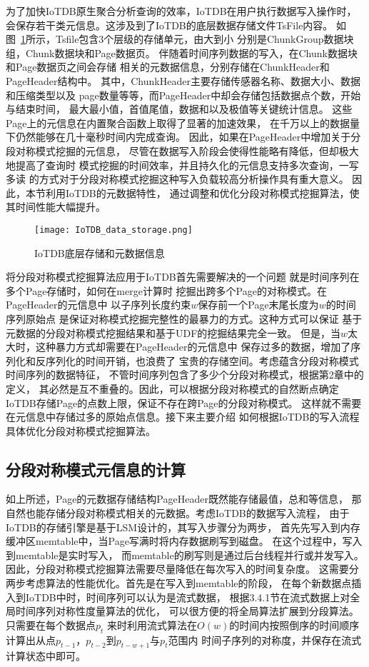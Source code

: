 为了加快IoTDB原生聚合分析查询的效率，IoTDB在用户执行数据写入操作时，
会保存若干类元信息。这涉及到了IoTDB的底层数据存储文件TsFile内容。
如图~\ref{fig:iotdb}所示，Tsfile包含3个层级的存储单元，由大到小
分别是ChunkGroup数据块组，Chunk数据块和Page数据页。
伴随着时间序列数据的写入，在Chunk数据块和Page数据页之间会存储
相关的元数据信息，分别存储在ChunkHeader和PageHeader结构中。
其中，ChunkHeader主要存储传感器名称、数据大小、数据和压缩类型以及
page数量等等，而PageHeader中却会存储包括数据点个数，开始与结束时间，
最大最小值，首值尾值，数据和以及极值等关键统计信息。
这些Page上的元信息在内置聚合函数上取得了显著的加速效果，
在千万以上的数据量下仍然能够在几十毫秒时间内完成查询。
因此，如果在PageHeader中增加关于分段对称模式挖掘的元信息，
尽管在数据写入阶段会使得性能略有降低，但却极大地提高了查询时
模式挖掘的时间效率，并且持久化的元信息支持多次查询，一写多读
的方式对于分段对称模式挖掘这种写入负载较高分析操作具有重大意义。
因此，本节利用IoTDB的元数据特性，
通过调整和优化分段对称模式挖掘算法，使其时间性能大幅提升。
\begin{figure}
  \centering
  \texttt{[image: IoTDB\_data\_storage.png]}
  \caption{IoTDB底层存储和元数据信息}
  \label{fig:iotdb}
\end{figure}

将分段对称模式挖掘算法应用于IoTDB首先需要解决的一个问题
就是时间序列在多个Page存储时，如何在merge计算时
挖掘出跨多个Page的对称模式。在PageHeader的元信息中
以子序列长度约束$w$保存前一个Page末尾长度为$w$的时间序列原始点
是保证对称模式挖掘完整性的最暴力的方式。这种方式可以保证
基于元数据的分段对称模式挖掘结果和基于UDF的挖掘结果完全一致。
但是，当$w$太大时，这种暴力方式却需要在PageHeader的元信息中
保存过多的数据，增加了序列化和反序列化的时间开销，也浪费了
宝贵的存储空间。考虑蕴含分段对称模式时间序列的数据特征，
不管时间序列包含了多少个分段对称模式，根据第2章中的定义，
其必然是互不重叠的。因此，可以根据分段对称模式的自然断点确定
IoTDB存储Page的点数上限，保证不存在跨Page的分段对称模式。
这样就不需要在元信息中存储过多的原始点信息。接下来主要介绍
如何根据IoTDB的写入流程具体优化分段对称模式挖掘算法。


\subsection{分段对称模式元信息的计算}

如上所述，Page的元数据存储结构PageHeader既然能存储最值，总和等信息，
那自然也能存储分段对称模式相关的元数据。考虑IoTDB的数据写入流程，
由于IoTDB的存储引擎是基于LSM设计的，其写入步骤分为两步，
首先先写入到内存缓冲区memtable中，当Page写满时将内存数据刷写到磁盘。
在这个过程中，写入到memtable是实时写入，
而memtable的刷写则是通过后台线程并行或并发写入。
因此，分段对称模式挖掘算法需要尽量降低在每次写入的时间复杂度。
这需要分两步考虑算法的性能优化。首先是在写入到memtable的阶段，
在每个新数据点插入到IoTDB中时，时间序列可以认为是流式数据，
根据3.4.1节在流式数据上对全局时间序列对称性度量算法的优化，
可以很方便的将全局算法扩展到分段算法。只需要在每个数据点$p_t$
来时利用流式算法在$O(w)$的时间内按照倒序的时间顺序
计算出从点$p_{t-1}$，$p_{t-2}$到$p_{t-w+1}$与$p_t$范围内
时间子序列的对称度，并保存在流式计算状态中即可。

